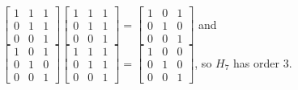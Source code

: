 \documentclass[12pt,letterpaper]{article}
\begin{document}
\begin{enumerate}
\begin{enumerate}
          $
            \begin{bmatrix}
              1 & 1 & 1 \\
              0 & 1 & 1 \\
              0 & 0 & 1
            \end{bmatrix}
            \begin{bmatrix}
              1 & 1 & 1 \\
              0 & 1 & 1 \\
              0 & 0 & 1
            \end{bmatrix}
            =
            \begin{bmatrix}
              1 & 0 & 1 \\
              0 & 1 & 0 \\
              0 & 0 & 1
            \end{bmatrix}
          $ and
          $
            \begin{bmatrix}
              1 & 0 & 1 \\
              0 & 1 & 0 \\
              0 & 0 & 1
            \end{bmatrix}
            \begin{bmatrix}
              1 & 1 & 1 \\
              0 & 1 & 1 \\
              0 & 0 & 1
            \end{bmatrix}
            =
            \begin{bmatrix}
              1 & 0 & 0 \\
              0 & 1 & 0 \\
              0 & 0 & 1
            \end{bmatrix}
          $, so $H_7$ has order 3.
      \end{enumerate}
  \end{enumerate}
\end{document}
